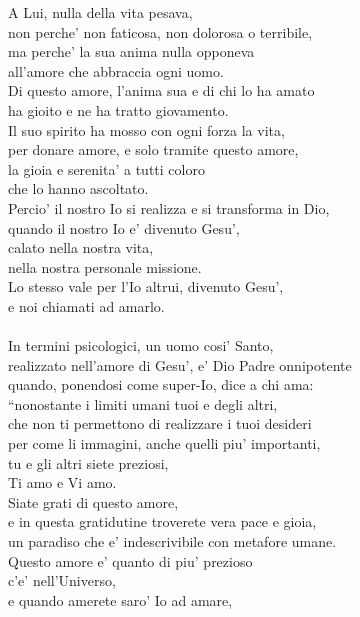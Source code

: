 \begin{haiku}
    A Lui, nulla della vita pesava,\\
    non perche' non faticosa, non dolorosa o terribile,\\
    ma perche' la sua anima nulla opponeva\\
    all'amore che abbraccia ogni uomo.\\
    Di questo amore, l'anima sua e di chi lo ha amato\\
    ha gioito e ne ha tratto giovamento.\\
    Il suo spirito ha mosso con ogni forza la vita,\\
    per donare amore, e solo tramite questo amore,\\
    la gioia e serenita' a tutti coloro\\
    che lo hanno ascoltato.\\
    Percio' il nostro Io si realizza e si transforma in Dio, \\
    quando il nostro Io e' divenuto Gesu',\\
    calato nella nostra vita,\\
    nella nostra personale missione.\\
    Lo stesso vale per l'Io altrui, divenuto Gesu',\\
    e noi chiamati ad amarlo.\\
    \leavevmode\\
    In termini psicologici, un uomo cosi' Santo,\\
    realizzato nell'amore di Gesu', e' Dio Padre onnipotente\\
    quando, ponendosi come super-Io, dice a chi ama:\\
    ``nonostante i limiti umani tuoi e degli altri,\\
    che non ti permettono di realizzare i tuoi desideri\\
    per come li immagini, anche quelli piu' importanti,\\
    tu e gli altri siete preziosi,\\
    Ti amo e Vi amo.\\
    Siate grati di questo amore,\\
    e in questa gratidutine
    troverete vera pace e gioia,\\
    un paradiso che e' indescrivibile con metafore umane.\\
    Questo amore e' quanto di piu' prezioso \\
    c'e' nell'Universo,\\
    e quando amerete saro' Io ad amare,\\

\end{haiku}
